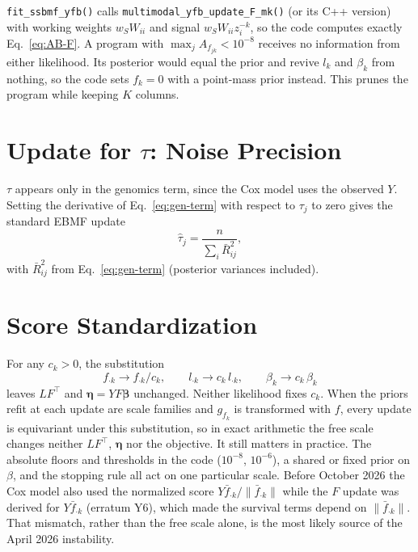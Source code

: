 \documentclass[11pt]{article}
\newcommand{\ws}{w_S}
\begin{document}
\begin{codebox}
\texttt{fit\_ssbmf\_yfb()} calls \texttt{multimodal\_yfb\_update\_F\_mk()} (or its
C++ version) with working weights $\ws W_{ii}$ and signal
$\ws W_{ii}z^{-k}_i$, so the code computes exactly Eq.~\eqref{eq:AB-F}. A program
with $\max_j A_{f_{jk}} < 10^{-8}$ receives no information from either likelihood.
Its posterior would equal the prior and revive $l_k$ and $\beta_k$ from nothing,
so the code sets $f_k = 0$ with a point-mass prior instead. This prunes the
program while keeping $K$ columns.
\end{codebox}

\section{Update for $\tau$: Noise Precision}\label{sec:tau}

$\tau$ appears only in the genomics term, since the Cox model uses the observed
$Y$. Setting the derivative of Eq.~\eqref{eq:gen-term} with respect to $\tau_j$
to zero gives the standard EBMF update
\begin{equation}\label{eq:tau}
  \hat\tau_j = \frac{n}{\sum_i\bar{R}^2_{ij}} ,
\end{equation}
with $\bar R^2_{ij}$ from Eq.~\eqref{eq:gen-term} (posterior variances included).

\section{Score Standardization}\label{sec:scaling}

For any $c_k > 0$, the substitution
\[
  f_{\cdot k}\to f_{\cdot k}/c_k,\qquad
  l_{\cdot k}\to c_k\,l_{\cdot k},\qquad
  \beta_k\to c_k\,\beta_k
\]
leaves $LF^\top$ and $\bm\eta = YF\bm\beta$ unchanged. Neither likelihood fixes
$c_k$. When the priors refit at each update are scale families and $g_{f_k}$ is
transformed with $f$, every update is equivariant under this substitution, so in
exact arithmetic the free scale changes neither $LF^\top$, $\bm\eta$ nor the
objective. It still matters in practice. The absolute floors and thresholds in
the code ($10^{-8}$, $10^{-6}$), a shared or fixed prior on $\beta$, and the
stopping rule all act on one particular scale. Before October 2026 the Cox model
also used the normalized score $Y\bar f_{\cdot k}/\lVert\bar f_{\cdot k}\rVert$ while
the $F$ update was derived for $Y\bar f_{\cdot k}$ (erratum Y6), which made the
survival terms depend on $\lVert\bar f_{\cdot k}\rVert$. That mismatch, rather than
the free scale alone, is the most likely source of the April 2026 instability.
\end{document}
